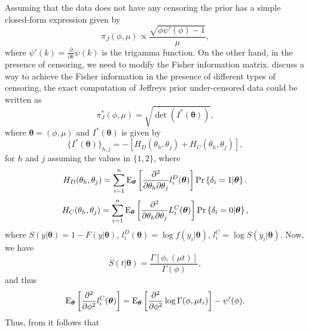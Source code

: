 Assuming that the data does not have any censoring the prior has a simple closed-form expression given by
\begin{equation*}%
\pi_J\left(\phi,\mu\right)\propto \frac{\sqrt{\phi\psi'(\phi)-1}}{\mu},
\end{equation*}
where $\psi'(k)=\frac{\partial}{\partial k}\psi(k)$ is the trigamma function.
On the other hand, in the presence of censoring, we need to modify the Fisher information matrix.  \cite{de2001jeffreys} discuss a way to achieve the Fisher information in the presence of different types of censoring, the exact computation of Jeffreys prior under-censored data could be written as
\begin{equation*}
\pi_J^*\left(\phi,\mu\right)=\sqrt{\det(I^*(\boldsymbol{\theta}))},
\end{equation*}
where $\boldsymbol{\theta}=(\phi,\mu)$ and $I^*(\boldsymbol{\theta})$ is given by
\begin{equation*} \{I^*(\boldsymbol{\theta})\}_{h,j} = -[H_D(\theta_h,\theta_j)+H_C(\theta_h,\theta_j)],
\end{equation*}
for $h$ and $j$ assuming the values in $\{1,2\}$, where
\begin{equation*} 
H_D(\theta_h,\theta_j) = \sum_{i=1}^n \operatorname{E}_{\boldsymbol{\theta}}\left[\frac{\partial^2}{\partial \theta_h\partial \theta_j} l_i^D(\boldsymbol{\theta})\right]\operatorname{Pr}\left\{\delta_i=1|\boldsymbol{\theta}\right\}.
\end{equation*}
\begin{equation*}
H_C(\theta_h,\theta_j) = \sum_{i=1}^n \operatorname{E}_{\boldsymbol{\theta}}\left[\frac{\partial^2}{\partial \theta_h\partial \theta_j} L^C_i(\boldsymbol{\theta})\right]\operatorname{Pr}\left\{\delta_i=0|\boldsymbol{\theta}\right\},
\end{equation*}
where $S(y|\boldsymbol{\theta}) = 1-F(y|\boldsymbol{\theta})$, $l_i^D(\boldsymbol{\theta})=\log f(y_i|\boldsymbol{\theta})$, $l_i^C=\log S(y_i|\boldsymbol{\theta})$. Now, we have
\begin{equation*} 
S(t|\boldsymbol{\theta}) = \frac{\Gamma[\phi,(\mu t)]}{\Gamma(\phi)},
\end{equation*}
and thus
\begin{equation*} \operatorname{E}_{\boldsymbol{\theta}}\left[ \frac{\partial^2}{\partial \phi ^2} l_i^C(\boldsymbol{\theta})\right] = \operatorname{E}_{\boldsymbol{\theta}}\left[ \frac{\partial^2}{\partial \phi ^2} \log \Gamma(\phi,\mu t_i)\right]-\psi'(\phi).
\end{equation*}
Thus, from \cite{1990-Geddes} it follows that
